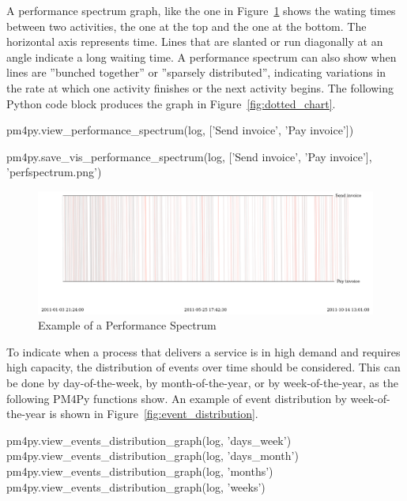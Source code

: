 A performance spectrum graph, like the one in Figure~\ref{fig:perf_spectrum} shows the wating times between two activities, the one at the top and the one at the bottom. The horizontal axis represents time. Lines that are slanted or run diagonally at an angle indicate a long waiting time. A performance spectrum can also show when lines are ''bunched together'' or ''sparsely distributed'', indicating variations in the rate at which one activity finishes or the next activity begins. The following Python code block produces the graph in Figure~\ref{fig:dotted_chart}.

\begin{samepage}
\begin{pythoncode}
pm4py.view_performance_spectrum(log,
    ['Send invoice', 'Pay invoice'])

pm4py.save_vis_performance_spectrum(log,
    ['Send invoice', 'Pay invoice'],
    'perfspectrum.png') 
\end{pythoncode}
\end{samepage}

\begin{figure}
\centering
\includegraphics[width=.9\textwidth]{perfspectrum.png}
\caption{Example of a Performance Spectrum}
\label{fig:perf_spectrum}
\end{figure}

To indicate when a process that delivers a service is in high demand and requires high capacity, the distribution of events over time should be considered. This can be done by day-of-the-week, by month-of-the-year, or by week-of-the-year, as the following PM4Py functions show. An example of event distribution by week-of-the-year is shown in Figure~\ref{fig:event_distribution}.

\begin{samepage}
\begin{pythoncode}
pm4py.view_events_distribution_graph(log, 'days_week')
pm4py.view_events_distribution_graph(log, 'days_month')
pm4py.view_events_distribution_graph(log, 'months')
pm4py.view_events_distribution_graph(log, 'weeks')
\end{pythoncode}
\end{samepage}

